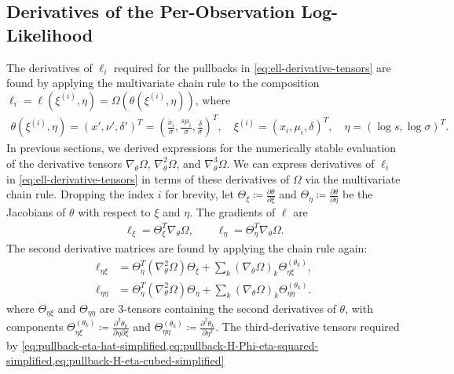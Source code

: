 \documentclass{article}
\begin{document}
\subsection{Derivatives of the Per-Observation Log-Likelihood}

The derivatives of $\ell_i$ required for the pullbacks in \cref{eq:ell-derivative-tensors} are found by applying the multivariate chain rule to the composition $\ell_i = \ell(\xi^{(i)}, \eta) = \Omega(\theta(\xi^{(i)}, \eta))$, where
%
\begin{align}
  \theta(\xi^{(i)}, \eta) = (x', \nu', \delta')^T = \left(\frac{x_i}{\sigma}, \frac{s \mu_i}{\sigma}, \frac{\delta}{\sigma}\right)^T,
  \quad
  \xi^{(i)} = (x_i, \mu_i, \delta)^T,
  \quad
  \eta = (\log s, \log \sigma)^T.
\end{align}
%
In previous sections, we derived expressions for the numerically stable evaluation of the derivative tensors $\nabla_\theta \Omega$, $\nabla_\theta^2\Omega$, and $\nabla_\theta^3\Omega$.
We can express derivatives of $\ell_i$ in \cref{eq:ell-derivative-tensors} in terms of these derivatives of $\Omega$ via the multivariate chain rule.
Dropping the index $i$ for brevity, let $\Theta_{\xi} \coloneqq \frac{\partial \theta}{\partial \xi}$ and $\Theta_{\eta} \coloneqq \frac{\partial \theta}{\partial \eta}$ be the Jacobians of $\theta$ with respect to $\xi$ and $\eta$.
The gradients of $\ell$ are
%
\begin{align}
  \ell_{\xi} = \Theta_{\xi}^{T} \nabla_\theta \Omega,
  \qquad
  \ell_{\eta}   = \Theta_{\eta}^{T} \nabla_\theta \Omega.
\end{align}
%
The second derivative matrices are found by applying the chain rule again:
%
\begin{align}
  \ell_{\eta \xi}  & = \Theta_{\eta}^{T} (\nabla_\theta^2 \Omega) \Theta_\xi + \sum_{k} (\nabla_\theta \Omega)_{k} \Theta_{\eta\xi}^{(\theta_k)},   \\
  \ell_{\eta \eta} & = \Theta_{\eta}^{T} (\nabla_\theta^2 \Omega) \Theta_\eta + \sum_{k} (\nabla_\theta \Omega)_{k} \Theta_{\eta\eta}^{(\theta_k)}.
\end{align}
%
where $\Theta_{\eta\xi}$ and $\Theta_{\eta\eta}$ are 3-tensors containing the second derivatives of $\theta$, with components $\Theta_{\eta\xi}^{(\theta_k)} \coloneqq \frac{\partial^2 \theta_k}{\partial \eta \partial \xi}$ and $\Theta_{\eta\eta}^{(\theta_k)} \coloneqq \frac{\partial^2 \theta_k}{\partial \eta^2}$.
The third-derivative tensors required by \cref{eq:pullback-eta-hat-simplified,eq:pullback-H-Phi-eta-squared-simplified,eq:pullback-H-eta-cubed-simplified}
\end{document}
